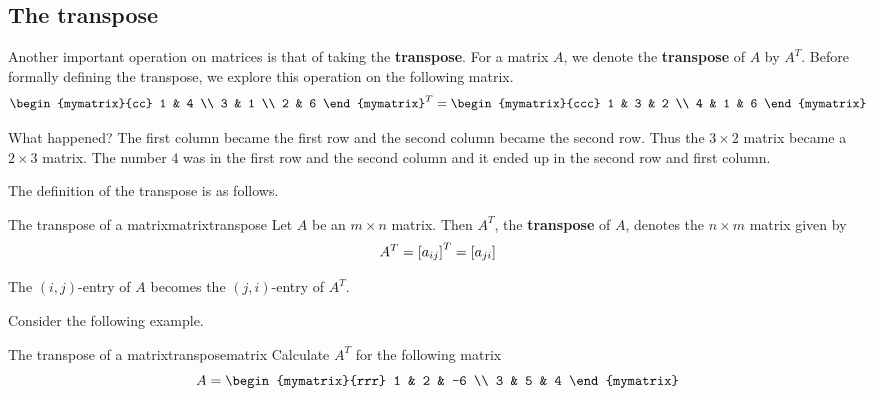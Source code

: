 \subsection{The transpose}

Another important operation on matrices is that of taking the \textbf{transpose}. For a matrix $A$, we denote the
\textbf{transpose} of $A$ by $A^T$. Before formally defining the transpose, we explore this
operation on the following matrix.
\begin{equation*}
\begin{mymatrix}{cc}
1 & 4 \\
3 & 1 \\
2 & 6
\end{mymatrix} ^{T}=\allowbreak \begin{mymatrix}{ccc}
1 & 3 & 2 \\
4 & 1 & 6
\end{mymatrix}
\end{equation*}

What happened? The first column became the first row and the second column
became the second row. Thus the $3\times 2$ matrix became a $2\times 3$
matrix. The number $4$ was in the first row and the second column and it
ended up in the second row and first column. 

The definition of the transpose is as follows.

\begin{definition}{The transpose of a matrix}{matrixtranspose}
Let $A$ be an $m\times n$ matrix. Then $A^{T}$, the \textbf{transpose} of $A$,  denotes the $n\times m$
matrix given by 
\begin{equation*}
A^{T} = \left[a _{ij}\right] ^{T}= \left[a_{ji} \right]
\end{equation*}
\end{definition}

The $\left( i, j  \right)$-entry of $A$ becomes the 
$\left( j,i \right)$-entry of $A^T$. 

Consider the following example.

\begin{example}{The transpose of a matrix}{transposematrix}
Calculate $A^T$ for the following matrix
\begin{equation*}
A = \begin{mymatrix}{rrr}
1 & 2 & -6 \\
3 & 5 & 4
\end{mymatrix}
\end{equation*}
\end{example}

